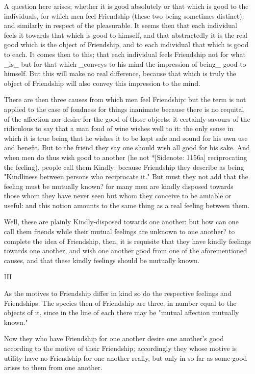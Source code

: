 A question here arises; whether it is good absolutely or that which is
good to the individuals, for which men feel Friendship (these two being
sometimes distinct): and similarly in respect of the pleasurable. It
seems then that each individual feels it towards that which is good to
himself, and that abstractedly it is the real good which is the object
of Friendship, and to each individual that which is good to each. It
comes then to this; that each individual feels Friendship not for what
_is_ but for that which _conveys to his mind the impression of being_
good to himself. But this will make no real difference, because that
which is truly the object of Friendship will also convey this impression
to the mind.

There are then three causes from which men feel Friendship: but the term
is not applied to the case of fondness for things inanimate because
there is no requital of the affection nor desire for the good of those
objects: it certainly savours of the ridiculous to say that a man fond
of wine wishes well to it: the only sense in which it is true being that
he wishes it to be kept safe and sound for his own use and benefit. But
to the friend they say one should wish all good for his sake. And when
men do thus wish good to another (he not *[Sidenote: 1156a]
reciprocating the feeling), people call them Kindly; because Friendship
they describe as being "Kindliness between persons who reciprocate it."
But must they not add that the feeling must be mutually known? for many
men are kindly disposed towards those whom they have never seen but whom
they conceive to be amiable or useful: and this notion amounts to the
same thing as a real feeling between them.

Well, these are plainly Kindly-disposed towards one another: but how can
one call them friends while their mutual feelings are unknown to one
another? to complete the idea of Friendship, then, it is requisite that
they have kindly feelings towards one another, and wish one another good
from one of the aforementioned causes, and that these kindly feelings
should be mutually known.

III


As the motives to Friendship differ in kind so do the respective
feelings and Friendships. The species then of Friendship are three, in
number equal to the objects of it, since in the line of each there may
be "mutual affection mutually known."

Now they who have Friendship for one another desire one another's good
according to the motive of their Friendship; accordingly they whose
motive is utility have no Friendship for one another really, but only in
so far as some good arises to them from one another.

